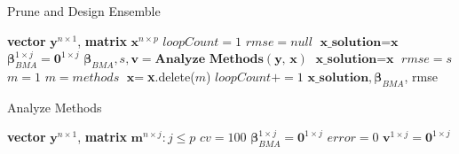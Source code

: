 \documentclass[journal=jpcbfk, manuscript=article]{achemso}
\newcommand{\+}[1]{\ensuremath{\mathbf{#1}}}
\begin{document}
\begin{table}[t] 
	\begin{minipage}[t]{0.45\linewidth}\centering 
		\begin{algorithm}[H] 
			\footnotesize 
			\caption{\newline Prune and Design Ensemble} \label{Method:Alg1} 
			\begin{algorithmic}[1] 
				{\scriptsize 
				\REQUIRE \textbf{vector} $\textbf{y}^{n \times 1}$, \textbf{matrix} $\textbf{x}^{n \times p}$\; 
				\vspace{2.5mm} 
				\STATE $loopCount = 1$\; 
				\STATE $rmse = null$\; 
				\STATE $\textbf{x\_solution} = \textbf{x}$\; 
				\STATE $\boldsymbol{\beta}_{BMA}^{1 \times j} = \textbf{0}^{1 \times j}$ \; 
				\; 
					\STATE $\boldsymbol{\beta}_{BMA}, s, \textbf{v} = \textbf{Analyze Methods}(\textbf{y, x})$\; 
					\; 
						\STATE $\textbf{x\_solution} = \textbf{x}$\; 
						\STATE $rmse = s$\; 
					\ENDIF\; 
					\STATE $m = 1$\; 
					\; 
						\; 
							\STATE $m = methods$\;
						\ENDIF\;
					\ENDFOR\;
					\STATE $\textbf{x} = $\textbf{x}.delete($m$)
					\;
					\STATE $loopCount += 1$\;
				\ENDWHILE\;
				\RETURN $\textbf{x\_solution},\boldsymbol{\beta}_{BMA}$, rmse\;} 
			\end{algorithmic}
		\end{algorithm}
	\end{minipage}
	\hspace{0.5cm}
	\begin{minipage}[t]{0.45\linewidth}
		\centering
		\begin{algorithm}[H] 
			\footnotesize 
			\caption{\newline Analyze Methods} \label{Method:Alg2} 
			\begin{algorithmic}[1] 
				{\scriptsize 
				\REQUIRE  \textbf{vector} $\textbf{y}^{n \times 1}$, \textbf{matrix} $\textbf{m}^{n \times j}: j \leq p$\; 
				\vspace{2.5mm} 
				\STATE $cv = 100$\; \; 
				\STATE $\boldsymbol{{\beta}}_{BMA}^{1 \times j} = \textbf{0}^{1 \times j}$ \; 
				\STATE $error = 0$ \; 
				\STATE $\textbf{v}^{1 \times j} = \textbf{0}^{1 \times j}$ \;  
}
\end{algorithmic}
\end{algorithm}
\end{minipage}
\end{table}
\end{document}
